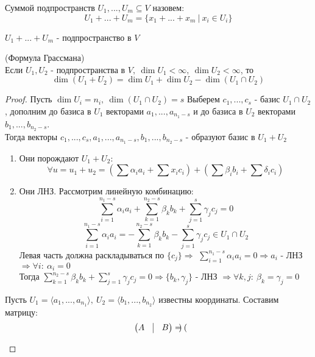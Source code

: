   \begin{definition}
    Суммой подпространств $U_1,...,U_m \subseteq V$ назовем: $$U_1 + ... + U_m = \{x_1+...+x_m \ | \ x_i \in U_i\}$$   
  \end{definition}
  \begin{subtheorem}
    $U_1 + ... + U_m$ - подпространство в $V$  
  \end{subtheorem}
  \begin{theorem} (Формула Грассмана)\\
    Если $U_1,U_2$ - подпространства в $V, \ \dim U_1 < \infty, \ \dim U_2 < \infty$, то 
    $$\dim (U_1+U_2) = \dim U_1 + \dim U_2 - \dim (U_1 \cap U_2)$$   
  \end{theorem}
  \begin{proof}
    Пусть $\dim U_i = n_i, \ \dim (U_1 \cap U_2) = s$
    Выберем $c_1,...,c_s$ - базис $U_1 \cap U_2$, дополним до базиса в $U_1$ векторами $a_1,...,a_{n_1-s}$ и до базиса в $U_2$ векторами $b_1,...,b_{n_2-s}$.\\ Тогда векторы $c_1,...,c_s,a_1,...,a_{n_1-s},b_1,...,b_{n_2-s}$ - образуют базис в $U_1 + U_2$
    \begin{enumerate}
      \item Они порождают $U_1 + U_2:$
      $$\forall u = u_1+u_2 = (\sum \alpha_i a_i + \sum x_i c_i) + (\sum \beta_i b_i + \sum \delta_i c_i)$$
      \item Они ЛНЗ. Рассмотрим линейную комбинацию: 
      $$\sum \limits_{i=1}^{n_1-s} \alpha_i a_i + \sum \limits_{k=1}^{n_2-s} \beta_k b_k + \sum \limits_{j=1}^{s} \gamma_j c_j = 0$$
      $$\sum \limits_{i=1}^{n_1-s} \alpha_i a_i = -\sum \limits_{k=1}^{n_2-s} \beta_k b_k - \sum \limits_{j=1}^{s} \gamma_j c_j \in U_1 \cap U_2$$
      Левая часть должна раскладываться по $\{c_j\} \Longrightarrow $ $\sum \limits_{i=1}^{n_1-s} \alpha_i a_i = 0 \Longrightarrow a_i$ - ЛНЗ $\Longrightarrow \forall i: \ \alpha_i = 0$ \\
      Тогда $\sum \limits_{k=1}^{n_2-s} \beta_k b_k + \sum \limits_{j=1}^{s} \gamma_j c_j = 0 \Longrightarrow \{b_k,\gamma_j\}$ - ЛНЗ $\Longrightarrow \forall k,j: \ \beta_k = \gamma_j = 0$  
    \end{enumerate}
    \begin{algorithm}
      Пусть $U_1 = \langle a_1,...,a_{n_1} \rangle, \ U_2 = \langle b_1,...,b_{n_2} \rangle$ известны координаты. Составим матрицу:
      $$\begin{pmatrix}
        A & \vline & B
      \end{pmatrix} = \begin{pmatrix}

\end{pmatrix}$$
\end{algorithm}
\end{proof}
